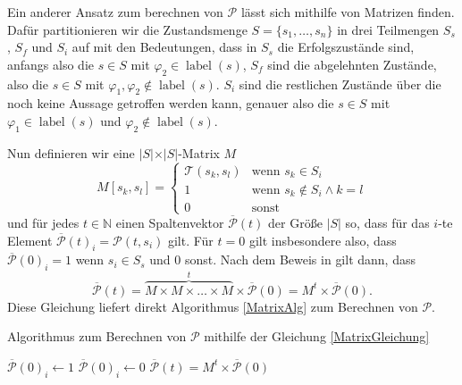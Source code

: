 Ein anderer Ansatz zum berechnen von $\mathcal{P}$ lässt sich mithilfe von Matrizen finden. Dafür partitionieren wir die Zustandsmenge $S=\{s_1,\dots,s_n\}$ in drei Teilmengen $S_s$, $S_f$ und $S_i$ auf mit den Bedeutungen, dass in $S_s$ die Erfolgszustände sind, anfangs also die $s\in S$ mit $\varphi_2\in \operatorname{label}(s)$, $S_f$ sind die abgelehnten Zustände, also die $s\in S$ mit $\varphi_1,\varphi_2 \notin \operatorname{label}(s)$. $S_i$ sind die restlichen Zustände über die noch keine Aussage getroffen werden kann, genauer also die $s\in S$ mit $\varphi_1\in \operatorname{label}(s)$ und $\varphi_2\notin \operatorname{label}(s)$. \cite{hansson1994logic}

Nun definieren wir eine $\vert S \vert \times \vert S \vert$-Matrix $M$
$$M[s_k,s_l] = \begin{cases}
	\mathcal{T}(s_k,s_l) & \text{wenn } s_k\in S_i \\
	1 & \text{wenn } s_k\notin S_i \land k=l \\
	0 & \text{sonst}
\end{cases}$$
und für jedes $t\in \mathbb{N}$ einen Spaltenvektor $\overline{\mathcal{P}}(t)$ der Größe $\vert S \vert$ so, dass für das $i$-te Element $\overline{\mathcal{P}}(t)_i=\mathcal{P}(t,s_i)$ gilt. 
Für $t=0$ gilt insbesondere also, dass $\overline{\mathcal{P}}(0)_i=1$ wenn $s_i\in S_s$ und $0$ sonst.
Nach dem Beweis in \cite{hansson1994logic} gilt dann, dass 
\begin{equation}
	\overline{\mathcal{P}}(t)=\overbrace{M \times M \times \dots \times M}^t \times \overline{\mathcal{P}}(0) = M^t\times \overline{\mathcal{P}}(0).
	\label{MatrixGleichung}
\end{equation}
Diese Gleichung liefert direkt Algorithmus \ref{MatrixAlg} zum Berechnen von $\mathcal{P}$. \cite{hansson1994logic}

\begin{algorithm}[h]
	\caption{Algorithmus zum Berechnen von $\mathcal{P}$ mithilfe der Gleichung \ref{MatrixGleichung} \cite{hansson1994logic}}
	\label{MatrixAlg}
	
	\begin{algorithmic}
		\State $\overline{\mathcal{P}}(0)_i \gets 1$
		\Else
		\State $\overline{\mathcal{P}}(0)_i \gets 0$
		\EndIf
		\EndFor
		\State $\overline{\mathcal{P}}(t)=M^t\times \overline{\mathcal{P}}(0)$
	\end{algorithmic}
\end{algorithm}


